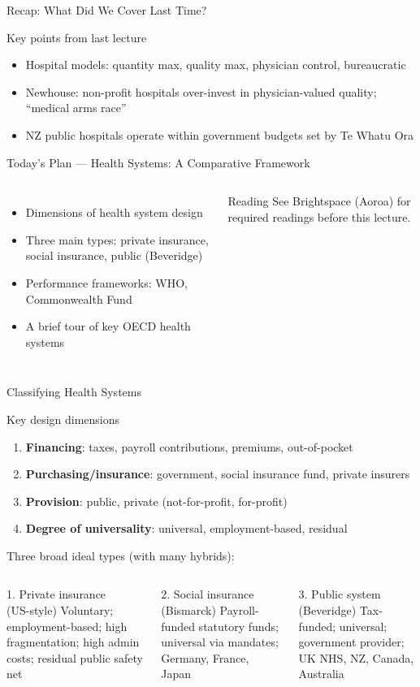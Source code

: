 \documentclass[aspectratio=169, 12pt]{beamer}
\newcommand{\recapslide}[1]{%
  \begin{frame}{Recap: What Did We Cover Last Time?}
    \begin{block}{Key points from last lecture}
      \begin{itemize}#1\end{itemize}
    \end{block}
  \end{frame}}
\newcommand{\planslide}[2]{%
  \begin{frame}{Today's Plan — #1}
    \begin{columns}
      \column{0.6\textwidth}
      \begin{itemize}#2\end{itemize}
      \column{0.38\textwidth}
      \begin{alertblock}{Reading}
        \footnotesize See Brightspace (Aoroa) for required readings before this lecture.
      \end{alertblock}
    \end{columns}
  \end{frame}}
\begin{document}
\recapslide{
  \item Hospital models: quantity max, quality max, physician control, bureaucratic
  \item Newhouse: non-profit hospitals over-invest in physician-valued quality; ``medical arms race''
  \item NZ public hospitals operate within government budgets set by Te Whatu Ora
}

\planslide{Health Systems: A Comparative Framework}{
  \item Dimensions of health system design
  \item Three main types: private insurance, social insurance, public (Beveridge)
  \item Performance frameworks: WHO, Commonwealth Fund
  \item A brief tour of key OECD health systems
}

\begin{frame}{Classifying Health Systems}
  \begin{block}{Key design dimensions}
    \begin{enumerate}
      \item \textbf{Financing}: taxes, payroll contributions, premiums, out-of-pocket
      \item \textbf{Purchasing/insurance}: government, social insurance fund, private insurers
      \item \textbf{Provision}: public, private (not-for-profit, for-profit)
      \item \textbf{Degree of universality}: universal, employment-based, residual
    \end{enumerate}
  \end{block}
  \vspace{0.3em}
  Three broad ideal types (with many hybrids):
  \begin{columns}
      \begin{block}{1. Private insurance\\(US-style)}
        {\small Voluntary; employment-based; high fragmentation; high admin costs; residual public safety net}
      \end{block}
      \begin{block}{2. Social insurance\\(Bismarck)}
        {\small Payroll-funded statutory funds; universal via mandates; Germany, France, Japan}
      \end{block}
      \begin{alertblock}{3. Public system\\(Beveridge)}
        {\small Tax-funded; universal; government provider; UK NHS, NZ, Canada, Australia}
      \end{alertblock}
  \end{columns}
\end{frame}
\end{document}
